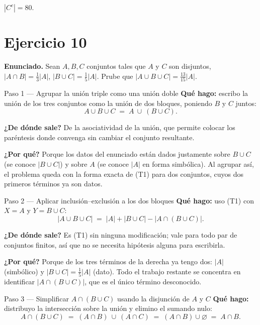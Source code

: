 \documentclass[11pt]{article}
\begin{document}
\begin{resp}
$|C^{c}| = 80$.
\end{resp}

\section*{Ejercicio 10}

\textbf{Enunciado.} Sean $A, B, C$ conjuntos tales que $A$ y $C$ son disjuntos, $|A\cap B| = \tfrac{1}{3}|A|$, $|B\cup C| = \tfrac{1}{5}|A|$. Prube que $|A\cup B\cup C| = \tfrac{13}{15}|A|$.

\begin{sol}

\begin{paso}{Paso 1 --- Agrupar la unión triple como una unión doble}
\textbf{Qué hago:} escribo la unión de los tres conjuntos como la unión de dos bloques, poniendo $B$ y $C$ juntos:
\[
A\cup B\cup C \;=\; A\ \cup\ (B\cup C).
\]

\textbf{¿De dónde sale?} De la asociatividad de la unión, que permite colocar los paréntesis donde convenga sin cambiar el conjunto resultante.

\textbf{¿Por qué?} Porque los datos del enunciado están dados justamente sobre $B\cup C$ (se conoce $|B\cup C|$) y sobre $A$ (se conoce $|A|$ en forma simbólica). Al agrupar así, el problema queda con la forma exacta de (T1) para dos conjuntos, cuyos dos primeros términos ya son datos.
\end{paso}

\begin{paso}{Paso 2 --- Aplicar inclusión--exclusión a los dos bloques}
\textbf{Qué hago:} uso (T1) con $X=A$ y $Y=B\cup C$:
\[
|A\cup B\cup C| \;=\; |A| + |B\cup C| - |A\cap (B\cup C)|.
\]

\textbf{¿De dónde sale?} Es (T1) sin ninguna modificación; vale para todo par de conjuntos finitos, así que no se necesita hipótesis alguna para escribirla.

\textbf{¿Por qué?} Porque de los tres términos de la derecha ya tengo dos: $|A|$ (simbólico) y $|B\cup C| = \tfrac{1}{5}|A|$ (dato). Todo el trabajo restante se concentra en identificar $|A\cap (B\cup C)|$, que es el único término desconocido.
\end{paso}

\begin{paso}{Paso 3 --- Simplificar $A\cap(B\cup C)$ usando la disjunción de $A$ y $C$}
\textbf{Qué hago:} distribuyo la intersección sobre la unión y elimino el sumando nulo:
\[
A\cap (B\cup C) \;=\; (A\cap B)\ \cup\ (A\cap C) \;=\; (A\cap B)\cup \varnothing \;=\; A\cap B.
\]


\end{paso}
\end{sol}
\end{document}
